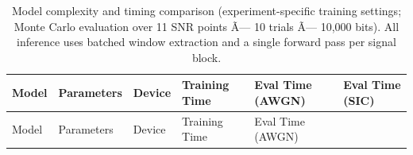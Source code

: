 \begin{longtable}[]{@{}
  >{\raggedright\arraybackslash}p{}
  >{\raggedright\arraybackslash}p{}
  >{\raggedright\arraybackslash}p{}
  >{\raggedright\arraybackslash}p{}
  >{\raggedright\arraybackslash}p{}
  >{\raggedright\arraybackslash}p{}@{}}
\caption{Model complexity and timing comparison (experiment-specific training settings; Monte Carlo evaluation over 11 SNR points Ã— 10 trials Ã— 10,000 bits). All inference uses batched window extraction and a single forward pass per signal block.}\label{tbl:table13}\tabularnewline
\toprule\noalign{}
\begin{minipage}[b]{\linewidth}\raggedright
Model
\end{minipage} & \begin{minipage}[b]{\linewidth}\raggedright
Parameters
\end{minipage} & \begin{minipage}[b]{\linewidth}\raggedright
Device
\end{minipage} & \begin{minipage}[b]{\linewidth}\raggedright
Training Time
\end{minipage} & \begin{minipage}[b]{\linewidth}\raggedright
Eval Time (AWGN)
\end{minipage} & \begin{minipage}[b]{\linewidth}\raggedright
Eval Time (SIC)
\end{minipage} \\
\midrule\noalign{}
\endfirsthead
\toprule\noalign{}
\begin{minipage}[b]{\linewidth}\raggedright
Model
\end{minipage} & \begin{minipage}[b]{\linewidth}\raggedright
Parameters
\end{minipage} & \begin{minipage}[b]{\linewidth}\raggedright
Device
\end{minipage} & \begin{minipage}[b]{\linewidth}\raggedright
Training Time
\end{minipage} & \begin{minipage}[b]{\linewidth}\raggedright
Eval Time (AWGN)
\end{minipage} & \begin{minipage}[b]{\linewidth}\raggedright

\end{minipage}
\end{longtable}
